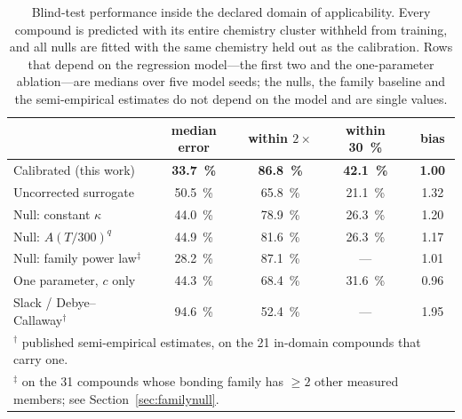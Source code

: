 \begin{table}[tp]
  \centering
  \caption{Blind-test performance inside the declared domain of applicability. Every compound is
  predicted with its entire chemistry cluster withheld from training, and all nulls are fitted with
  the same chemistry held out as the calibration. Rows that depend on the regression model---the
  first two and the one-parameter ablation---are medians over five model seeds; the nulls, the
  family baseline and the semi-empirical estimates do not depend on the model and are single
  values.}
  \label{tab:blind}
  \begin{tabular}{lcccc}
    \toprule
    & median error & within $2\times$ & within \SI{30}{\percent} & bias \\
    \midrule
    Calibrated (this work)   & \textbf{\SI{33.7}{\percent}} & \textbf{\SI{86.8}{\percent}}
                             & \textbf{\SI{42.1}{\percent}} & \textbf{1.00} \\
    Uncorrected surrogate    & \SI{50.5}{\percent} & \SI{65.8}{\percent}
                             & \SI{21.1}{\percent} & 1.32 \\
    Null: constant $\kappa$  & \SI{44.0}{\percent} & \SI{78.9}{\percent}
                             & \SI{26.3}{\percent} & 1.20 \\
    Null: $A(T/300)^{q}$     & \SI{44.9}{\percent} & \SI{81.6}{\percent}
                             & \SI{26.3}{\percent} & 1.17 \\
    \midrule
    Null: family power law$^{\ddagger}$ & \SI{28.2}{\percent} & \SI{87.1}{\percent}
                             & --- & 1.01 \\
    \midrule
    One parameter, $c$ only  & \SI{44.3}{\percent} & \SI{68.4}{\percent} & \SI{31.6}{\percent} & 0.96 \\
    Slack / Debye--Callaway$^{\dagger}$ & \SI{94.6}{\percent} & \SI{52.4}{\percent} & --- & 1.95 \\
    \bottomrule
    \multicolumn{5}{l}{\footnotesize $^{\dagger}$ published semi-empirical estimates, on the
      \num{21} in-domain compounds that carry one.} \\
    \multicolumn{5}{l}{\footnotesize $^{\ddagger}$ on the \num{31} compounds whose bonding family
      has $\geq 2$ other measured members; see Section~\ref{sec:familynull}.}
  \end{tabular}
\end{table}

